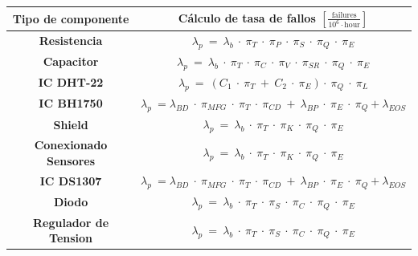 \begin{table}[H]
\centering
\begin{tabular}{|c|c|}
\hline
\textbf{Tipo de componente}   & \textbf{Cálculo de tasa de fallos $\left[\frac{\text{failures}}{10^6 \cdot \text{hour}}\right]$}                                                                               \\ \hline
\textbf{Resistencia}          & $\lambda_p \ = \ \lambda_b \ \cdot \  \pi_T \ \cdot \ \pi_P \ \cdot \ \pi_S \ \cdot \ \pi_Q \ \cdot \ \pi_E$                                                                   \\ \hline
\textbf{Capacitor}            & $\lambda_p \ = \ \lambda_b \ \cdot \  \pi_T \ \cdot \ \pi_C \ \cdot \ \pi_V \ \cdot \ \pi_{SR} \ \cdot \ \pi_Q \ \cdot \ \pi_E  $                                              \\ \hline
\textbf{IC DHT-22}            & $\lambda_p \ = \  (C_1 \ \cdot \ \pi_T \ + \ C_2 \ \cdot \ \pi_E ) \cdot \ \pi_Q \ \cdot \ \pi_L  $                                                                            \\ \hline
\textbf{IC BH1750}            & $\lambda_p \ = \lambda_{BD} \ \cdot \ \pi_{MFG} \ \cdot \ \pi_T \ \cdot \ \pi_{CD} \ + \ \lambda_{BP} \ \cdot \ \pi_E \ \cdot \ \pi_Q + \lambda_{EOS}$                         \\ \hline
\textbf{Shield}               & $\lambda_p \ = \ \lambda_b \ \cdot \  \pi_T \ \cdot \ \pi_K  \ \cdot \ \pi_Q \ \cdot \ \pi_E $                                                                                 \\ \hline
\textbf{Conexionado Sensores} & $\lambda_p \ = \ \lambda_b \ \cdot \  \pi_T \ \cdot \ \pi_K  \ \cdot \ \pi_Q \ \cdot \ \pi_E $                                                                                 \\ \hline
\textbf{IC DS1307}            & $\lambda_p \ = \lambda_{BD} \ \cdot \ \pi_{MFG} \ \cdot \ \pi_T \ \cdot \ \pi_{CD} \ + \ \lambda_{BP} \ \cdot \ \pi_E \ \cdot \ \pi_Q + \lambda_{EOS}$                         \\ \hline
\textbf{Diodo}                & $\lambda_p \ = \ \lambda_b \ \cdot \  \pi_T \ \cdot \ \pi_S  \ \cdot \ \pi_C \ \cdot \ \pi_Q \ \cdot \ \pi_E $                                                                 \\ \hline
\textbf{Regulador de Tension} & $\lambda_p \ = \ \lambda_b \ \cdot \  \pi_T \ \cdot \ \pi_S  \ \cdot \ \pi_C \ \cdot \ \pi_Q \ \cdot \ \pi_E $                                                                 \\ \hline

\end{tabular}
\end{table}
